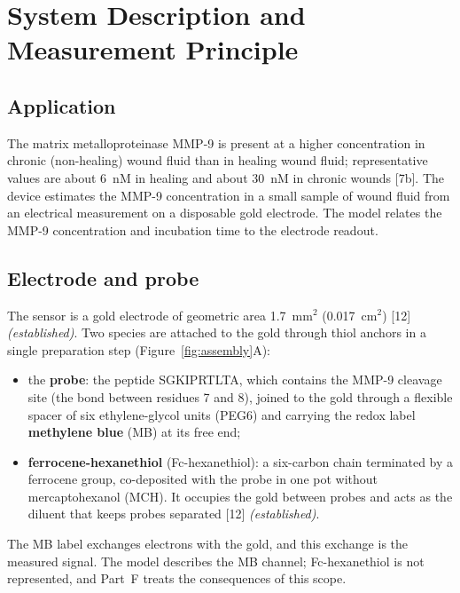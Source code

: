 \documentclass[10pt,a4paper]{article}
\numberwithin{equation}{section}
\newcommand{\cit}[1]{[#1]}
\newcommand{\CONF}{\textit{(established)}}
\newcommand{\figref}[1]{Figure~\ref{#1}}
\begin{document}
\section{System Description and Measurement Principle}
\label{sec:story}

\subsection{Application}

The matrix metalloproteinase MMP-9 is present at a higher concentration in
chronic (non-healing) wound fluid than in healing wound fluid; representative
values are about 6~nM in healing and about 30~nM in chronic wounds \cit{7b}. The
device estimates the MMP-9 concentration in a small sample of wound fluid from an
electrical measurement on a disposable gold electrode. The model relates the
MMP-9 concentration and incubation time to the electrode readout.

\subsection{Electrode and probe}

The sensor is a gold electrode of geometric area 1.7~mm$^2$ (0.017~cm$^2$)
\cit{12} \CONF. Two species are attached to the gold through thiol anchors in a single
preparation step (\figref{fig:assembly}A):
\begin{itemize}[leftmargin=*,noitemsep]
\item the \textbf{probe}: the peptide SGKIPRTLTA, which contains the MMP-9 cleavage
  site (the bond between residues 7 and 8), joined to the gold through a flexible
  spacer of six ethylene-glycol units (PEG6) and carrying the redox label
  \textbf{methylene blue} (MB) at its free end;
\item \textbf{ferrocene-hexanethiol} (Fc-hexanethiol): a six-carbon chain terminated
  by a ferrocene group, co-deposited with the probe in one pot without
  mercaptohexanol (MCH). It occupies the gold between probes and acts as the diluent
  that keeps probes separated \cit{12} \CONF.
\end{itemize}
The MB label exchanges electrons with the gold, and this exchange is the measured
signal. The model describes the MB channel; Fc-hexanethiol is not represented, and
Part~F treats the consequences of this scope.
\end{document}
